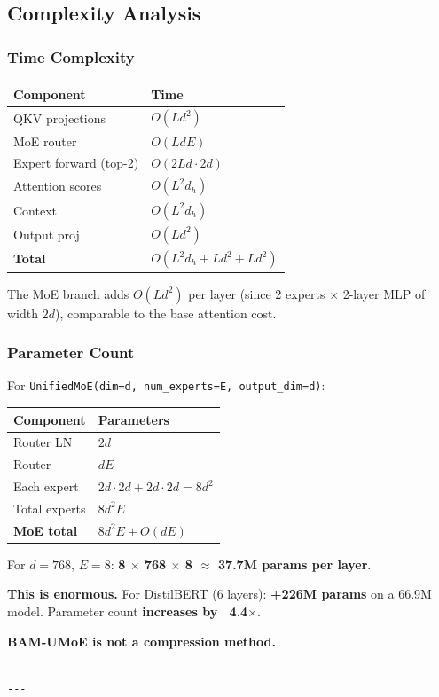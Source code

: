\subsection{Complexity Analysis}

\subsubsection{Time Complexity}

\begin{table}[H]
\centering
\small
\begin{tabular}{ll}
\toprule
\textbf{Component} & \textbf{Time} \\
\midrule
QKV projections & $O(L d^2)$ \\
MoE router & $O(L d E)$ \\
Expert forward (top-2) & $O(2 L d \cdot 2 d)$ \\
Attention scores & $O(L^2 d_h)$ \\
Context & $O(L^2 d_h)$ \\
Output proj & $O(L d^2)$ \\
\textbf{Total} & $O(L^2 d_h + L d^2 + L d^2)$ \\
\bottomrule
\end{tabular}
\end{table}

The MoE branch adds $O(L d^2)$ per layer (since 2 experts $\times$ 2-layer MLP 
of width $2d$), comparable to the base attention cost.

\subsubsection{Parameter Count}

For \texttt{UnifiedMoE(dim=d, num\_experts=E, output\_dim=d)}:

\begin{table}[H]
\centering
\small
\begin{tabular}{ll}
\toprule
\textbf{Component} & \textbf{Parameters} \\
\midrule
Router LN & $2d$ \\
Router & $d E$ \\
Each expert & $2d \cdot 2d + 2d \cdot 2d = 8d^2$ \\
Total experts & $8 d^2 E$ \\
\textbf{MoE total} & $8 d^2 E + O(d E)$ \\
\bottomrule
\end{tabular}
\end{table}

For $d = 768$, $E = 8$: \textbf{8 $\times$ 768  $\times$ 8 $\approx$ 37.7M params per layer}.

\textbf{This is enormous.} For DistilBERT (6 layers): \textbf{+226M params} on a 
66.9M model. Parameter count \textbf{increases by ~4.4$\times$}.

\textbf{BAM-UMoE is not a compression method.}
\begin{lstlisting}

---
\end{lstlisting}